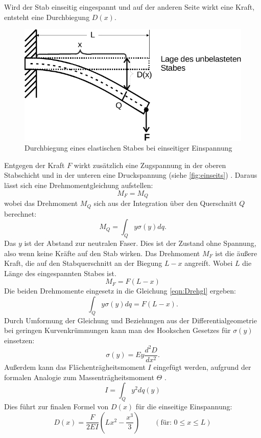 Wird der Stab einseitig eingespannt und auf der anderen Seite wirkt eine Kraft, entsteht eine Durchbiegung $D(x)$.
\begin{figure}
  \centering
  \includegraphics{content/einseitig.pdf}
  \caption{Durchbiegung eines elastischen Stabes bei einseitiger Einspannung \cite[107]{V103}}
  \label{fig:einseits}
\end{figure}
Entgegen der Kraft $F$ wirkt zusätzlich eine Zugspannung in der oberen Stabschicht und in der unteren eine Druckspannung (siehe \autoref{fig:einseits}) . 
Daraus lässt sich eine Drehmomentgleichung aufstellen:
\begin{equation}
    M_F = M_Q
\label{eqn:Drehgl}
\end{equation}
wobei das Drehmoment $M_Q$ sich aus der Integration über den Querschnitt $Q$ berechnet:
\begin{equation}
    M_Q = \int_Q y \sigma(y) dq.
    \label{eqn:M_Q}
\end{equation}
Das $y$ ist der Abstand zur neutralen Faser. Dies ist der Zustand ohne Spannung, also wenn keine Kräfte auf den Stab wirken.
Das Drehmoment $M_F$ ist die äußere Kraft, die auf den Stabquerschnitt an der Biegung $L-x$ angreift. 
Wobei $L$ die Länge des eingespannten Stabes ist.
\begin{equation}
    M_F = F(L-x)
    \label{eqn:M_F}
\end{equation}
Die beiden Drehmomente eingesetz in die Gleichung \autoref{eqn:Drehgl} ergeben:
\begin{equation}
  \int_Q y \sigma(y) dq = F(L-x).
\end{equation}
Durch Umformung der Gleichung und Beziehungen aus der Differentialgeometrie bei geringen Kurvenkrümmungen kann man des Hookschen Gesetzes für $\sigma(y)$ einsetzen:
\begin{equation}
   \sigma(y) = E y \frac{d^2D}{dx^2}.
\end{equation}
Außerdem kann das Flächenträgheitsmoment $I$ eingefügt werden, aufgrund der formalen Analogie zum Massenträgheitsmoment $\Theta$ \cite[109]{V103}.
\begin{equation}
   I = \int_Q y^2dq(y)
   \label{eqn:Flächenträgheitsmoment}
\end{equation}
Dies führt zur finalen Formel von $D(x)$ für die einseitige Einspannung:
\begin{equation}
  D(x) = \frac{F}{2 E I}(Lx^2 - \frac{x^3}{3}) \qquad (\text{für: } 0 \leq x \leq L)
  \label{eqn:Biegung}
\end{equation}

